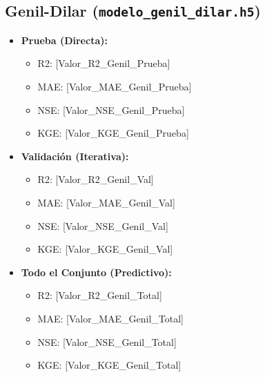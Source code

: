 \documentclass[12pt]{article}
\begin{document}
\subsection*{Genil-Dilar (\texttt{modelo\_genil\_dilar.h5})}
\begin{itemize}
    \item \textbf{Prueba (Directa):}
    \begin{itemize}
        \item R2: [Valor\_R2\_Genil\_Prueba]
        \item MAE: [Valor\_MAE\_Genil\_Prueba]
        \item NSE: [Valor\_NSE\_Genil\_Prueba]
        \item KGE: [Valor\_KGE\_Genil\_Prueba]
    \end{itemize}
    \item \textbf{Validación (Iterativa):}
    \begin{itemize}
        \item R2: [Valor\_R2\_Genil\_Val]
        \item MAE: [Valor\_MAE\_Genil\_Val]
        \item NSE: [Valor\_NSE\_Genil\_Val]
        \item KGE: [Valor\_KGE\_Genil\_Val]
    \end{itemize}
    \item \textbf{Todo el Conjunto (Predictivo):}
    \begin{itemize}
        \item R2: [Valor\_R2\_Genil\_Total]
        \item MAE: [Valor\_MAE\_Genil\_Total]
        \item NSE: [Valor\_NSE\_Genil\_Total]
        \item KGE: [Valor\_KGE\_Genil\_Total]
    \end{itemize}
\end{itemize}
\end{document}

